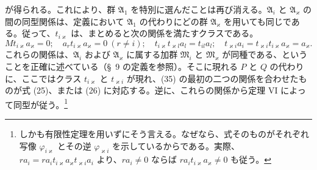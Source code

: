 が得られる。これにより、群 $\mathfrak A_1$ を特別に選んだことは再び消える。$\mathfrak A_i$ と $\mathfrak A_\varkappa$ の間の同型関係は、定義において $\mathfrak A_1$ の代わりにどの群 $\mathfrak A_\varkappa$ を用いても同じである。従って、$t_{i\varkappa}$ は、まとめると次の関係を満たすクラスである。
\begin{equation}
 Mt_{i\varkappa}a_\varkappa=0;
 \quad a_rt_{i\varkappa}a_\varkappa=0\ (r\ne i);
 \quad t_{i\varkappa}t_{\varkappa l}a_l=t_{il}a_l;
 \quad t_{\varkappa i}a_i=t_{\varkappa i}t_{i\varkappa}a_\varkappa=a_\varkappa.
\tag{35}
\end{equation}
これらの関係は、$\mathfrak A_i$ および $\mathfrak A_\varkappa$ に属する加群 $\mathfrak M_i$ と $\mathfrak M_\varkappa$ が同種である、ということを正確に述べている（\S~9 の定義を参照）。そこに現れる $P$ と $Q$ の代わりに、ここではクラス $t_{i\varkappa}$ と $t_{\varkappa i}$ が現れ、(35) の最初の二つの関係を合わせたものが式 (25)、または (26) に対応する。逆に、これらの関係から定理 VI によって同型が従う。\footnote{しかも有限性定理を用いずにそう言える。なぜなら、式そのものがそれぞれ写像 $\varphi_{i\varkappa}$ とその逆 $\varphi_{\varkappa i}$ を示しているからである。実際、$ra_i=ra_it_{i\varkappa}a_\varkappa t_{\varkappa i}a_i$ より、$ra_i\ne0$ ならば $ra_it_{i\varkappa}a_\varkappa\ne0$ も従う。}

